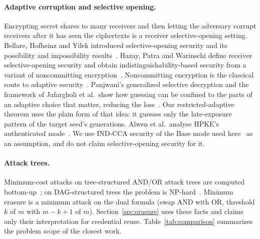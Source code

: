 \documentclass[pdflatex,sn-mathphys-num]{sn-jnl}%
\theoremstyle{plain}
\theoremstyle{definition}
\begin{document}
\paragraph{Adaptive corruption and selective opening.}
Encrypting secret shares to many receivers and then letting the adversary corrupt receivers after it has seen the ciphertexts is a receiver selective-opening setting. Bellare, Hofheinz and Yilek introduced selective-opening security and its possibility and impossibility results~\cite{bellare2009}. Hazay, Patra and Warinschi define receiver selective-opening security and obtain indistinguishability-based security from a variant of noncommitting encryption~\cite{hazay2015}. Noncommitting encryption is the classical route to adaptive security~\cite{canetti1996}. Panjwani's generalized selective decryption and the framework of Jafargholi et al.\ show how guessing can be confined to the parts of an adaptive choice that matter, reducing the loss~\cite{panjwani2007,jafargholi2017}. Our restricted-adaptive theorem uses the plain form of that idea: it guesses only the late-exposure pattern of the target seed's generations. Alwen et al.\ analyse HPKE's authenticated mode~\cite{alwen2021}. We use IND-CCA security of the Base mode used here~\cite{rfc9180} as an assumption, and do not claim selective-opening security for it.

\paragraph{Attack trees.}
Minimum-cost attacks on tree-structured AND/OR attack trees are computed bottom-up~\cite{mauw2005}; on DAG-structured trees the problem is NP-hard~\cite{lopuhaa2022}. Minimum erasure is a minimum attack on the dual formula (swap AND with OR, threshold $k$ of $m$ with $m-k+1$ of $m$). Section~\ref{sec:erasure} uses these facts and claims only their interpretation for credential reuse. Table~\ref{tab:comparison} summarizes the problem scope of the closest work.
\end{document}
